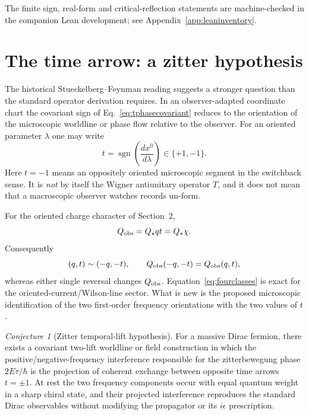 \documentclass[11pt]{article}
\newcommand{\sgn}{\operatorname{sgn}}
\theoremstyle{definition}\newtheorem{definition}[theorem]{Definition}
\theoremstyle{remark}\newtheorem{remark}[theorem]{Remark}\newtheorem{conjecture}[theorem]{Conjecture}
\begin{document}
The finite sign, real-form and critical-reflection statements are machine-checked in the companion Lean development; see Appendix~\ref{app:leaninventory}.

\section{The time arrow: a zitter hypothesis}
The historical Stueckelberg--Feynman reading suggests a stronger question than the standard operator derivation requires. In an observer-adapted coordinate chart the covariant sign of Eq.~\eqref{eq:tphasecovariant} reduces to the orientation of the microscopic worldline or phase flow relative to the observer. For an oriented parameter $\lambda$ one may write
\begin{equation}\label{eq:tmicroworldline}
 t=\sgn\!\left(\frac{dx^0}{d\lambda}\right)\in\{+1,-1\}.
\end{equation}
Here $t=-1$ means an oppositely oriented microscopic segment in the switchback sense. It is \emph{not} by itself the Wigner antiunitary operator $T$, and it does not mean that a macroscopic observer watches records un-form.

For the oriented charge character of Section~2,
\begin{equation}\label{eq:qrel}
 Q_{\rm obs}=Q_\star qt=Q_\star\chi.
\end{equation}
Consequently
\begin{equation}\label{eq:fourclasses}
 (q,t)\sim(-q,-t),
 \qquad
 Q_{\rm obs}(-q,-t)=Q_{\rm obs}(q,t),
\end{equation}
whereas either single reversal changes $Q_{\rm obs}$. Equation~\eqref{eq:fourclasses} is exact for the oriented-current/Wilson-line sector. What is new is the proposed microscopic identification of the two first-order frequency orientations with the two values of $t$.

\begin{conjecture}[Zitter temporal-lift hypothesis]\label{conj:zittime}
For a massive Dirac fermion, there exists a covariant two-lift worldline or field construction in which the positive/negative-frequency interference responsible for the zitterbewegung phase $2E\tau/\hbar$ is the projection of coherent exchange between opposite time arrows $t=\pm1$. At rest the two frequency components occur with equal quantum weight in a sharp chiral state, and their projected interference reproduces the standard Dirac observables without modifying the propagator or its $i\epsilon$ prescription.
\end{conjecture}
\end{document}
